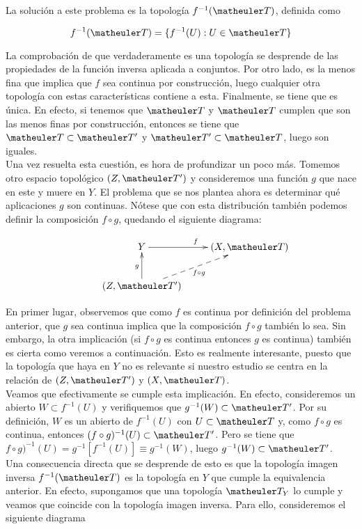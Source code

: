 La solución a este problema es la topología $f^{-1}(\T)$, definida como 

\[f^{-1}(\T)=\{f^{-1}(U):U\in \T\}\]

La comprobación de que verdaderamente es una topología se desprende de las propiedades de la función inversa aplicada a conjuntos. Por otro lado, es la menos fina que implica que $f$ sea continua por construcción, luego cualquier otra topología con estas características contiene a esta. Finalmente, se tiene que es única. En efecto, si tenemos que $\T$ y $\T$ cumplen que son las menos finas por construcción, entonces se tiene que $\T\subset \T'$ y $\T'\subset \T$, luego son iguales. \\

Una vez resuelta esta cuestión, es hora de profundizar un poco más. Tomemos otro espacio topológico $(Z,\T')$ y consideremos una función $g$ que nace en este y muere en $Y$. El problema que se nos plantea ahora es determinar qué aplicaciones $g$ son continuas. Nótese que con esta distribución también podemos definir la composición $f\circ g$, quedando el siguiente diagrama:

\begin{equation*}
\xymatrix{
&Y \ar[r]^f
&(X,\T) \\
&(Z,\T') \ar@{-->}[ru]_{f\circ g} \ar[u]^g}
\end{equation*}

En primer lugar, observemos que como $f$ es continua por definición del problema anterior, que $g$ sea continua implica que la composición $f\circ g$ también lo sea. Sin embargo, la otra implicación (si $f\circ g$ es continua entonces $g$ es continua) también es cierta como veremos a continuación. Esto es realmente interesante, puesto que la topología que haya en $Y$ no es relevante si nuestro estudio se centra en la relación de $(Z,\T')$ y $(X,\T)$. \\

Veamos que efectivamente se cumple esta implicación. En efecto, consideremos un abierto $W\subset f^{-1}(U)$ y verifiquemos que $g^{-1}(W)\subset \T'$. Por su definición, $W$ es un abierto de $f^{-1}(U)$ con $U\subset \T$ y, como $f\circ g$ es continua, entonces $(f\circ g)^{-1}(U)\subset \T'$. Pero se tiene que $f\circ g)^{-1}(U)=g^{-1}[f^{-1}(U)]\equiv g^{-1}(W)$, luego $g^{-1}(W)\subset \T'$. \\

Una consecuencia directa que se desprende de esto es que la topología imagen inversa $f^{-1}(\T)$ es la topología en $Y$ que cumple la equivalencia anterior. En efecto, supongamos que una topología $\T_Y$ lo cumple y veamos que coincide con la topología imagen inversa. Para ello, consideremos el siguiente diagrama

